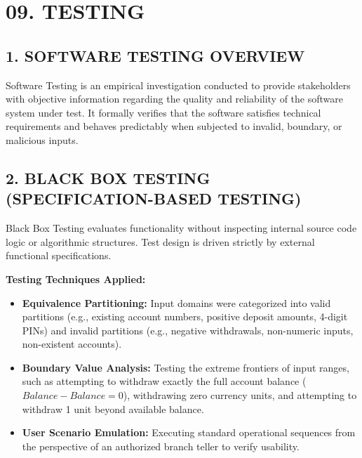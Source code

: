 \documentclass[12pt,a4paper]{article}
\begin{document}
\clearpage

\hypertarget{sec:testing}{}\label{sec:testing}
\section*{09. TESTING}
\vspace{0.5em}

\subsection*{1. SOFTWARE TESTING OVERVIEW}
Software Testing is an empirical investigation conducted to provide stakeholders with objective information regarding the quality and reliability of the software system under test. It formally verifies that the software satisfies technical requirements and behaves predictably when subjected to invalid, boundary, or malicious inputs.

\vspace{1.2em}
\subsection*{2. BLACK BOX TESTING (SPECIFICATION-BASED TESTING)}
Black Box Testing evaluates functionality without inspecting internal source code logic or algorithmic structures. Test design is driven strictly by external functional specifications.

\vspace{0.4em}
\noindent\textbf{Testing Techniques Applied:}
\begin{itemize}
    \item \textbf{Equivalence Partitioning:} Input domains were categorized into valid partitions (e.g., existing account numbers, positive deposit amounts, 4-digit PINs) and invalid partitions (e.g., negative withdrawals, non-numeric inputs, non-existent accounts).
    \item \textbf{Boundary Value Analysis:} Testing the extreme frontiers of input ranges, such as attempting to withdraw exactly the full account balance ($Balance - Balance = 0$), withdrawing zero currency units, and attempting to withdraw 1 unit beyond available balance.
    \item \textbf{User Scenario Emulation:} Executing standard operational sequences from the perspective of an authorized branch teller to verify usability.
\end{itemize}
\end{document}
